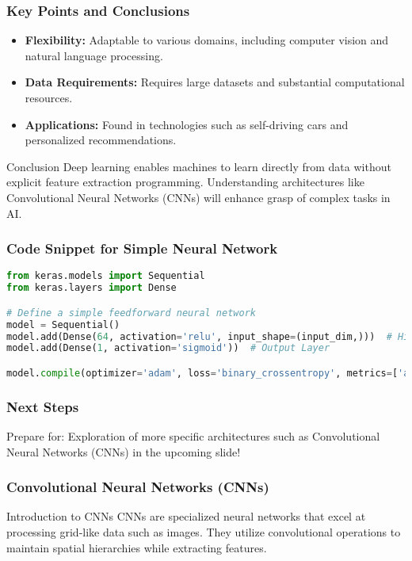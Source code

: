 \documentclass[aspectratio=169]{beamer}
\begin{document}
\begin{frame}[fragile]
    \frametitle{Key Points and Conclusions}
    \begin{itemize}
        \item \textbf{Flexibility:} Adaptable to various domains, including computer vision and natural language processing.
        \item \textbf{Data Requirements:} Requires large datasets and substantial computational resources.
        \item \textbf{Applications:} Found in technologies such as self-driving cars and personalized recommendations.
    \end{itemize}
    
    \begin{block}{Conclusion}
        Deep learning enables machines to learn directly from data without explicit feature extraction programming. Understanding architectures like Convolutional Neural Networks (CNNs) will enhance grasp of complex tasks in AI.
    \end{block}
\end{frame}

\begin{frame}[fragile]
    \frametitle{Code Snippet for Simple Neural Network}
    \begin{lstlisting}[language=Python]
from keras.models import Sequential
from keras.layers import Dense

# Define a simple feedforward neural network
model = Sequential()
model.add(Dense(64, activation='relu', input_shape=(input_dim,)))  # Hidden Layer
model.add(Dense(1, activation='sigmoid'))  # Output Layer

model.compile(optimizer='adam', loss='binary_crossentropy', metrics=['accuracy'])
    \end{lstlisting}
\end{frame}

\begin{frame}[fragile]
    \frametitle{Next Steps}
    \begin{block}{Prepare for:}
        Exploration of more specific architectures such as Convolutional Neural Networks (CNNs) in the upcoming slide!
    \end{block}
\end{frame}

\begin{frame}[fragile]
    \frametitle{Convolutional Neural Networks (CNNs)}
    \begin{block}{Introduction to CNNs}
        CNNs are specialized neural networks that excel at processing grid-like data such as images. 
        They utilize convolutional operations to maintain spatial hierarchies while extracting features.
    \end{block}
\end{frame}
\end{document}
